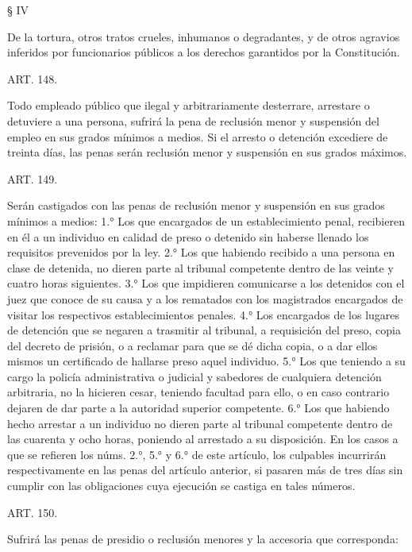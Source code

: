     § IV

    De la tortura, otros tratos crueles, inhumanos o degradantes, y de otros agravios inferidos por funcionarios públicos a los derechos garantidos por la Constitución.








    ART. 148.

    Todo empleado público que ilegal y arbitrariamente desterrare, arrestare o detuviere a una persona, sufrirá la pena de reclusión menor y suspensión del empleo en sus grados mínimos a medios.
    Si el arresto o detención excediere de treinta días, las penas serán reclusión menor y suspensión en sus grados máximos.


    ART. 149.

    Serán castigados con las penas de reclusión menor y suspensión en sus grados mínimos a medios:
    1.° Los que encargados de un establecimiento penal, recibieren en él a un individuo en calidad de preso o detenido sin haberse llenado los requisitos prevenidos por la ley.
    2.° Los que habiendo recibido a una persona en clase de detenida, no dieren parte al tribunal competente dentro de las veinte y cuatro horas siguientes.
    3.° Los que impidieren comunicarse a los detenidos con el juez que conoce de su causa y a los rematados con los magistrados encargados de visitar los respectivos establecimientos penales.
    4.° Los encargados de los lugares de detención que se negaren a trasmitir al tribunal, a requisición del preso, copia del decreto de prisión, o a reclamar para que se dé dicha copia, o a dar ellos mismos un certificado de hallarse preso aquel individuo.
    5.° Los que teniendo a su cargo la policía administrativa o judicial y sabedores de cualquiera detención arbitraria, no la hicieren cesar, teniendo facultad para ello, o en caso contrario dejaren de dar parte a la autoridad superior competente.
    6.° Los que habiendo hecho arrestar a un individuo no dieren parte al tribunal competente dentro de las cuarenta y ocho horas, poniendo al arrestado a su disposición.
    En los casos a que se refieren los núms. 2.°, 5.° y 6.° de este artículo, los culpables incurrirán respectivamente en las penas del artículo anterior, si pasaren más de tres días sin cumplir con las obligaciones cuya ejecución se castiga en tales números.




    ART. 150.

    Sufrirá las penas de presidio o reclusión menores y la accesoria que corresponda:

